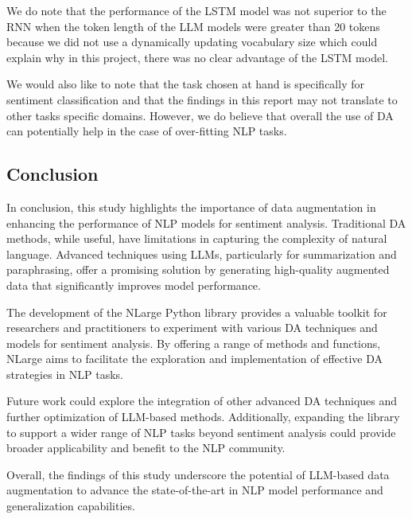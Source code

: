 \documentclass{article}
\begin{document}
We do note that the performance of the LSTM model was not superior to the RNN
when the token length of the LLM models were greater than 20 tokens because we
did not use a dynamically updating vocabulary size which could explain why in
this project, there was no clear advantage of the LSTM model.

We would also like to note that the task chosen at hand is specifically for
sentiment classification and that the findings in this report may not translate
to other tasks specific domains. However, we do believe that overall the use of
DA can potentially help in the case of over-fitting NLP tasks.

\subsection{Conclusion}

In conclusion, this study highlights the importance of data augmentation in
enhancing the performance of NLP models for sentiment analysis. Traditional DA
methods, while useful, have limitations in capturing the complexity of natural
language. Advanced techniques using LLMs, particularly for summarization and
paraphrasing, offer a promising solution by generating high-quality augmented
data that significantly improves model performance.

The development of the NLarge Python library provides a valuable toolkit for
researchers and practitioners to experiment with various DA techniques and
models for sentiment analysis. By offering a range of methods and functions,
NLarge aims to facilitate the exploration and implementation of effective DA
strategies in NLP tasks.

Future work could explore the integration of other advanced DA techniques and
further optimization of LLM-based methods. Additionally, expanding the library
to support a wider range of NLP tasks beyond sentiment analysis could provide
broader applicability and benefit to the NLP community.

Overall, the findings of this study underscore the potential of LLM-based data
augmentation to advance the state-of-the-art in NLP model performance and
generalization capabilities.



\end{document}
